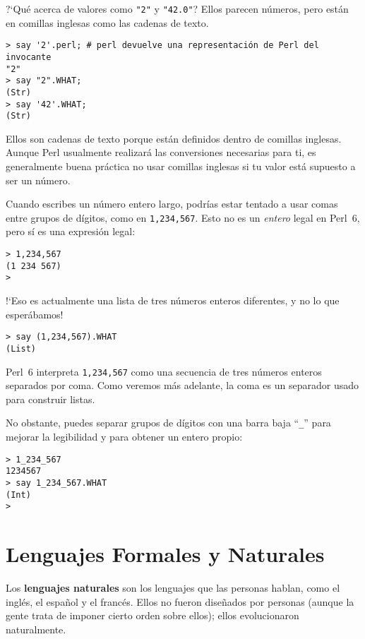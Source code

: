 ?`Qué acerca de valores como \verb'"2"' y \verb'"42.0"'?
Ellos parecen números, pero están en comillas inglesas como las 
cadenas de texto.

\begin{lstlisting}
> say '2'.perl; # perl devuelve una representación de Perl del invocante
"2"
> say "2".WHAT;
(Str)
> say '42'.WHAT;
(Str)
\end{lstlisting}
%

Ellos son cadenas de texto porque están definidos dentro de comillas inglesas.
Aunque Perl usualmente realizará las conversiones necesarias para ti, es generalmente
buena práctica no usar comillas inglesas si tu valor está supuesto a ser un
número.

Cuando escribes un número entero largo, podrías estar tentado a usar comas
entre grupos de dígitos, como en {\tt 1,234,567}. Esto no es un {\em entero}
legal en Perl~6, pero sí es una expresión legal:

\begin{lstlisting}
> 1,234,567
(1 234 567)
>
\end{lstlisting}
%
!`Eso es actualmente una lista de tres números enteros diferentes, 
y no lo que esperábamos! 

\begin{lstlisting}
> say (1,234,567).WHAT
(List)
\end{lstlisting}

Perl~6 interpreta {\tt 1,234,567} como una secuencia de tres números enteros
separados por coma. Como veremos más adelante, la coma es un separador usado
para construir listas.

No obstante, puedes separar grupos de dígitos con una barra baja ``\verb"_"''
para mejorar la legibilidad y para obtener un entero propio:

\begin{lstlisting}
> 1_234_567
1234567
> say 1_234_567.WHAT
(Int)
>
\end{lstlisting}
%




\section{Lenguajes Formales y Naturales}

Los {\bf lenguajes naturales} son los lenguajes que las personas hablan,
como el inglés, el español y el francés.  Ellos no fueron diseñados por personas
(aunque la gente trata de imponer cierto orden sobre ellos); ellos evolucionaron
naturalmente.


